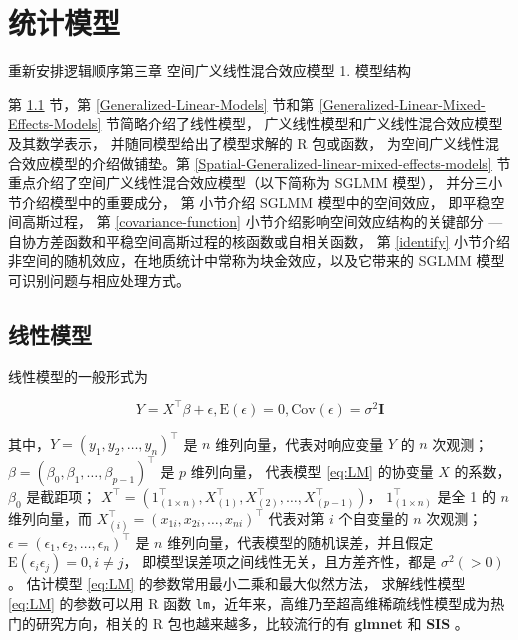 \documentclass[12pt,a4paper,UTF8,twoside]{book}
\theoremstyle{definition}
\theoremstyle{definition}
\theoremstyle{definition}
\theoremstyle{remark}
\begin{document}
\hypertarget{models}{%
\chapter{统计模型}\label{models}}

{重新安排逻辑顺序第三章 空间广义线性混合效应模型 1. 模型结构}

第 \ref{Linear-Models} 节，第 \ref{Generalized-Linear-Models} 节和第
\ref{Generalized-Linear-Mixed-Effects-Models} 节简略介绍了线性模型，
广义线性模型和广义线性混合效应模型及其数学表示，
并随同模型给出了模型求解的 R 包或函数，
为空间广义线性混合效应模型的介绍做铺垫。第
\ref{Spatial-Generalized-linear-mixed-effects-models}
节重点介绍了空间广义线性混合效应模型（以下简称为 SGLMM 模型），
并分三小节介绍模型中的重要成分， 第 小节介绍 SGLMM 模型中的空间效应，
即平稳空间高斯过程， 第 \ref{covariance-function}
小节介绍影响空间效应结构的关键部分 ---
自协方差函数和平稳空间高斯过程的核函数或自相关函数， 第 \ref{identify}
小节介绍非空间的随机效应，在地质统计中常称为块金效应，以及它带来的 SGLMM
模型可识别问题与相应处理方式。

\hypertarget{Linear-Models}{%
\section{线性模型}\label{Linear-Models}}

线性模型的一般形式为

\begin{equation}
Y = X^{\top}\beta + \epsilon, \mathrm{E}(\epsilon) = 0, \mathrm{Cov}(\epsilon) = \sigma^2\mathbf{I}  \label{eq:LM}
\end{equation}

\noindent 其中，\(Y = (y_1,y_2,\ldots,y_n)^{\top}\) 是 \(n\)
维列向量，代表对响应变量 \(Y\) 的 \(n\) 次观测；
\(\beta = (\beta_0,\beta_1,\ldots,\beta_{p-1})^{\top}\) 是 \(p\)
维列向量， 代表模型 \eqref{eq:LM} 的协变量 \(X\) 的系数，\(\beta_0\)
是截距项；
\(X^{\top} = (1_{(1\times n)}^{\top},X_{(1)}^{\top},X_{(2)}^{\top},\ldots,X_{(p-1)}^{\top})\)，
\(1_{(1\times n)}^{\top}\) 是全 1 的 \(n\) 维列向量，而
\(X_{(i)}^{\top} = (x_{1i},x_{2i},\ldots,x_{ni})^{\top}\) 代表对第 \(i\)
个自变量的 \(n\) 次观测；
\(\epsilon = (\epsilon_1,\epsilon_2,\ldots,\epsilon_n)^{\top}\) 是 \(n\)
维列向量，代表模型的随机误差，并且假定
\(\mathrm{E}(\epsilon_i \epsilon_j) = 0, i \ne j\)，
即模型误差项之间线性无关，且方差齐性，都是 \(\sigma^2(>0)\)。 估计模型
\eqref{eq:LM} 的参数常用最小二乘和最大似然方法， 求解线性模型 \eqref{eq:LM}
的参数可以用 R 函数
\texttt{lm}，近年来，高维乃至超高维稀疏线性模型成为热门的研究方向，相关的
R 包也越来越多，比较流行的有 \textbf{glmnet} \citep{glmnet2011JSS} 和
\textbf{SIS} \citep{SIS2016JSS}。
\end{document}
